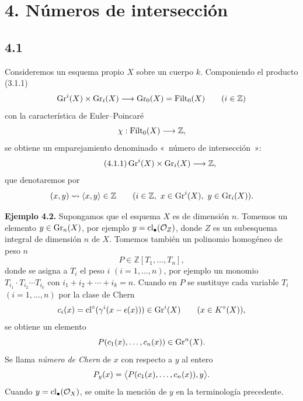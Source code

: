 
\section*{4. Números de intersección}

\subsection*{4.1}
Consideremos un esquema propio \(X\) sobre un cuerpo \(k\). Componiendo el
producto (3.1.1)
\[
 \operatorname{Gr}^i(X)\times\operatorname{Gr}_i(X)\longrightarrow \operatorname{Gr}_0(X)=\operatorname{Filt}_0(X)
 \qquad (i\in\mathbb Z)
\]
con la característica de Euler--Poincaré
\[
 \chi:\operatorname{Filt}_0(X)\longrightarrow\mathbb Z,
\]
se obtiene un emparejamiento denominado «~número de intersección~»:
\begin{equation}\tag{4.1.1}
 \operatorname{Gr}^i(X)\times\operatorname{Gr}_i(X)\longrightarrow \mathbb Z,
\end{equation}
que denotaremos por
\[
 (x,y)\rightsquigarrow \langle x,y\rangle\in\mathbb Z
 \qquad (i\in\mathbb Z,\ x\in\operatorname{Gr}^i(X),\ y\in\operatorname{Gr}_i(X)).
\]

\textbf{Ejemplo 4.2.} Supongamos que el esquema \(X\) es de dimensión \(n\).
Tomemos un elemento \(y\in\operatorname{Gr}_n(X)\), por ejemplo
\(y=\operatorname{cl}_\bullet(\mathcal O_Z)\), donde \(Z\) es un subesquema integral de
dimensión \(n\) de \(X\). Tomemos también un polinomio homogéneo de peso
\(n\)
\[
 P\in\mathbb Z[T_1,\ldots,T_n],
\]
donde se asigna a \(T_i\) el peso \(i\) \((i=1,\ldots,n)\), por ejemplo un
monomio \(T_{i_1}\cdot T_{i_2}\cdots T_{i_k}\) con
\(i_1+i_2+\cdots+i_k=n\). Cuando en \(P\) se sustituye cada variable \(T_i\)
\((i=1,\ldots,n)\) por la clase de Chern
\[
 c_i(x)=\cl^\circ(\gamma^i(x-\epsilon(x))\sisi{}{)}\in\Gr^i(X) %
 \qquad(x\in K^\circ(X)),
\]
se obtiene un elemento
\[
 P(c_1(x),\ldots,c_n(\sisi{X}{x}))\in\Gr^n(X). %
\]
Se llama \emph{número de Chern} de \(x\) con respecto a \(y\) al entero
\[
 P_y(x)=\sisi{\bigl\langle P(c_1(x)),\ldots,c_n(x),y\bigr\rangle}{\bigl\langle P(c_1(x),\ldots,c_n(x)),y\bigr\rangle}. %
\]
Cuando \(y=\operatorname{cl}_\bullet(\mathcal O_X)\), se omite la mención de \(y\) en la
terminología precedente.

